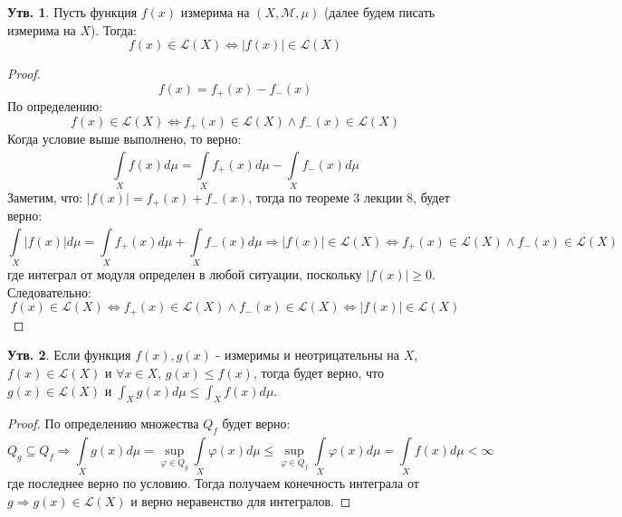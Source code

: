 \documentclass[12pt]{article}
\newcommand{\ML}{\mathcal{L}}
\newcommand{\MM}{\mathcal{M}}
\theoremstyle{definition}
\newtheorem{prop}{Утв.}
\newcommand{\ddint}[2]{\displaystyle\int\limits_{#1}^{#2}}
\begin{document}
\begin{prop}
	Пусть функция $f(x)$ измерима на $(X, \MM, \mu)$ (далее будем писать измерима на $X$). Тогда: 
	$$
		f(x) \in \ML(X) \Leftrightarrow |f(x)| \in \ML(X)
	$$
\end{prop}
\begin{proof}
	$$
		f(x) = f_+(x) - f_{-}(x)
	$$
	По определению:
	$$
		f(x) \in \ML(X) \Leftrightarrow f_+(x) \in \ML(X) \wedge f_-(x) \in \ML(X)
	$$
	Когда условие выше выполнено, то верно:
	$$
		\ddint{X}{}f(x)d\mu = \ddint{X}{}f_+(x)d\mu - \ddint{X}{}f_-(x)d\mu
	$$
	Заметим, что: $|f(x)| = f_+(x) + f_-(x)$, тогда по теореме $3$ лекции $8$, будет верно:
	$$
		\ddint{X}{}|f(x)|d\mu = \ddint{X}{}f_+(x)d\mu + \ddint{X}{}f_-(x)d\mu \Rightarrow |f(x)| \in \ML(X) \Leftrightarrow f_+(x) \in \ML(X) \wedge f_-(x) \in \ML(X)
	$$
	где интеграл от модуля определен в любой ситуации, поскольку $|f(x)| \geq 0$. Следовательно:
	$$
		f(x) \in \ML(X) \Leftrightarrow f_+(x) \in \ML(X) \wedge f_-(x) \in \ML(X) \Leftrightarrow |f(x)| \in \ML(X)
	$$
\end{proof}

\begin{prop}
	Если функция $f(x), g(x)$ - измеримы и неотрицательны на $X$, $f(x) \in \ML(X)$ и  $\forall x \in X, \, g(x) \leq f(x)$, тогда будет верно, что $g(x) \in \ML(X)$ и $\int_X g(x) d\mu \leq \int_X f(x)d\mu$.
\end{prop}
\begin{proof}
	По определению множества $Q_f$ будет верно:
	$$
		Q_g \subseteq Q_f \Rightarrow \ddint{X}{}g(x)d\mu = \sup\limits_{\varphi \in Q_g}  \ddint{X}{}\varphi(x) d\mu \leq \sup\limits_{\varphi \in Q_f}  \ddint{X}{}\varphi(x) d\mu = \ddint{X}{}f(x)d\mu < \infty
	$$
	где последнее верно по условию. Тогда получаем конечность интеграла от $g \Rightarrow g(x) \in \ML(X)$ и верно неравенство для интегралов.
\end{proof}
\end{document}
